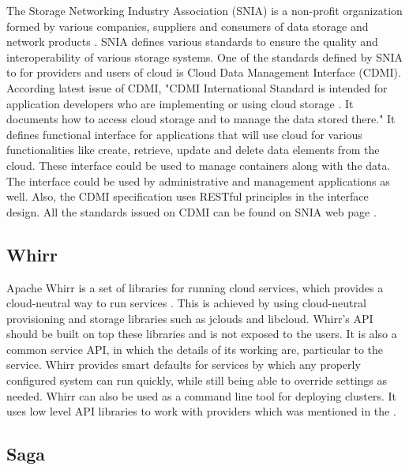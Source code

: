 {     The Storage Networking Industry Association (SNIA) is a non-profit
     organization formed by
     various companies, suppliers and consumers of data storage and
     network products \cite{www-sniawebsite}. SNIA defines various standards to ensure the
     quality and interoperability of various storage systems. One of
     the standards defined by SNIA to for providers and users of cloud
     is Cloud Data Management Interface (CDMI). According latest issue
     of CDMI, "CDMI International Standard is
     intended for application developers who are implementing or using
     cloud storage \cite{cdmi-manual}. It documents how to access cloud storage and to
     manage the data stored there." It defines functional interface
     for applications that will use cloud for various functionalities
     like create, retrieve, update and delete data elements from the
     cloud. These interface could be used to manage containers along
     with the data. The interface could be used by administrative and
     management applications as well. Also, the CDMI specification
     uses RESTful principles in the interface design. All the
     standards issued on CDMI can be found on SNIA web page
     \cite{www-cdmiwebsite}.


     \pv

\subsection{Whirr}
     
     Apache Whirr is a set of libraries for running cloud services,
     which provides a cloud-neutral way to run services
     \cite{www-ApacheWhirr}. This is achieved by using cloud-neutral
     provisioning and storage libraries such as jclouds and
     libcloud. Whirr's API should be built on top these libraries and
     is not exposed to the users. It is also a common service API, in
     which the details of its working are, particular to the service.
     Whirr provides smart defaults for services by which any properly
     configured system can run quickly, while still being able to
     override settings as needed. Whirr can also be used as a command
     line tool for deploying clusters. It uses low level API libraries
     to work with providers which was mentioned in the
     \cite{www-slideshare-ApacheWhirr}.

     
\subsection{Saga}

}
